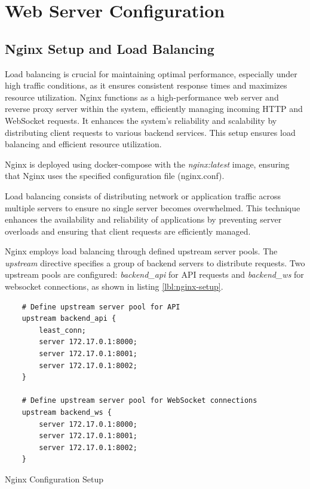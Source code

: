 \section{Web Server Configuration}
\subsection{Nginx Setup and Load Balancing}
Load balancing is crucial for maintaining 
optimal performance, especially under high traffic conditions, as it ensures consistent response times and maximizes 
resource utilization.
Nginx \cite{rfc57} functions as a high-performance web server and reverse proxy server within the system, efficiently managing 
incoming HTTP and WebSocket requests. It enhances the system's reliability and scalability by distributing client 
requests to various backend services. This setup ensures load balancing and efficient resource utilization.

Nginx is deployed using docker-compose with the \textit{nginx:latest} image, ensuring that Nginx uses the specified 
configuration file (nginx.conf).

Load balancing consists of distributing network or application traffic across multiple servers to ensure no single 
server becomes overwhelmed. This technique enhances the availability and reliability of applications by preventing 
server overloads and ensuring that client requests are efficiently managed.

Nginx employs load balancing through defined upstream server pools. The \textit{upstream} directive specifies a group of 
backend servers to distribute requests. Two upstream pools are configured: \textit{backend\_api} for API requests 
and \textit{backend\_ws} for websocket connections, as shown in listing \ref{lbl:nginx-setup}.


\begin{listing}[h]
    \begin{verbatim}
    # Define upstream server pool for API
    upstream backend_api {
        least_conn;
        server 172.17.0.1:8000;
        server 172.17.0.1:8001;
        server 172.17.0.1:8002; 
    }

    # Define upstream server pool for WebSocket connections
    upstream backend_ws {
        server 172.17.0.1:8000;
        server 172.17.0.1:8001;
        server 172.17.0.1:8002;
    }
    \end{verbatim}
    \caption{Nginx Configuration Setup}
    \label{lbl:nginx-setup}
    \end{listing}

